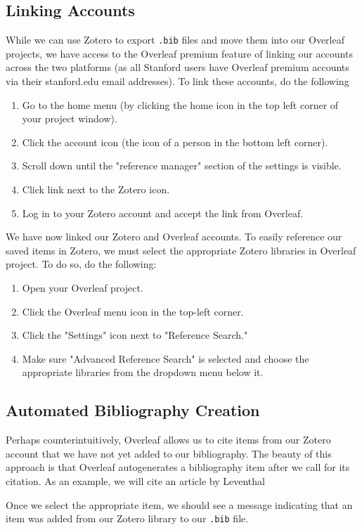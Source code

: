 \documentclass{article}
\begin{document}
\subsection{Linking Accounts}
While we can use Zotero to export \texttt{.bib} files and move them into our Overleaf projects, we have access to the Overleaf premium feature of linking our accounts across the two platforms (as all Stanford users have Overleaf premium accounts via their stanford.edu email addresses).
To link these accounts, do the following
\begin{enumerate}
    \item Go to the home menu (by clicking the home icon in the top left corner of your project window).
    \item Click the account icon (the icon of a person in the bottom left corner).
    \item Scroll down until the "reference manager" section of the settings is visible.
    \item Click link next to the Zotero icon.
    \item Log in to your Zotero account and accept the link from Overleaf.
\end{enumerate}
We have now linked our Zotero and Overleaf accounts. To easily reference our saved items in Zotero, we must select the appropriate Zotero libraries in Overleaf project.
To do so, do the following:
\begin{enumerate}
    \item Open your Overleaf project.
    \item Click the Overleaf menu icon in the top-left corner.
    \item Click the "Settings" icon next to "Reference Search."
    \item Make sure "Advanced Reference Search" is selected and choose the appropriate libraries from the dropdown menu below it.
\end{enumerate}
\subsection{Automated Bibliography Creation}
Perhaps counterintuitively, Overleaf allows us to cite items from our Zotero account that we have not yet added to our bibliography. The beauty of this approach is that Overleaf autogenerates a bibliography item after we call for its citation.
As an example, we will cite an article by Leventhal\cite{leventhal_chamber_2014}

Once we select the appropriate item, we should see a message indicating that an item was added from our Zotero library to our \texttt{.bib} file.

\end{document}
